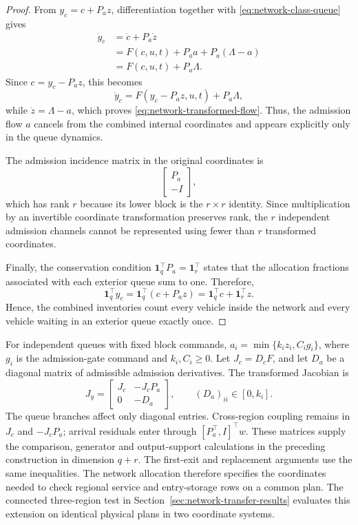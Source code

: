 \documentclass[journal,10pt]{IEEEtran}
\begin{document}
\begin{proof}
From
$y_c=c+P_a z$,
differentiation together with \eqref{eq:network-class-queue} gives
\[
\begin{aligned}
\dot y_c
&=\dot c+P_a\dot z\\
&=F(c,u,t)+P_a a+P_a(\Lambda-a)\\
&=F(c,u,t)+P_a\Lambda.
\end{aligned}
\]
Since $c=y_c-P_a z$, this becomes
\[
\dot y_c=F(y_c-P_a z,u,t)+P_a\Lambda,
\]
while $\dot z=\Lambda-a$, which proves
\eqref{eq:network-transformed-flow}. Thus, the admission flow $a$ cancels
from the combined internal coordinates and appears explicitly only in the
queue dynamics.

The admission incidence matrix in the original coordinates is
\[
\begin{bmatrix}P_a\\-I\end{bmatrix},
\]
which has rank $r$ because its lower block is the $r\times r$ identity.
Since multiplication by an invertible coordinate transformation preserves
rank, the $r$ independent admission channels cannot be represented using
fewer than $r$ transformed coordinates.

Finally, the conservation condition
$\mathbf1_q^\top P_a=\mathbf1_r^\top$ states that the allocation fractions
associated with each exterior queue sum to one. Therefore,
\[
\mathbf1_q^\top y_c
=\mathbf1_q^\top(c+P_a z)
=\mathbf1_q^\top c+\mathbf1_r^\top z.
\]
Hence, the combined inventories count every vehicle inside the network and
every vehicle waiting in an exterior queue exactly once.
\end{proof}

For independent queues with fixed block commands,
$a_i=\min\{k_i z_i,C_i g_i\}$, where $g_i$ is the admission-gate command and
$k_i,C_i\ge0$. Let $J_c=D_cF$, and let $D_a$ be a diagonal matrix of
admissible admission derivatives. The transformed Jacobian is
\begin{equation}
 J_y=\begin{bmatrix}J_c&-J_cP_a\\0&-D_a\end{bmatrix},
 \qquad (D_a)_{ii}\in[0,k_i].
 \label{eq:network-jacobian}
\end{equation}
The queue branches affect only diagonal entries. Cross-region coupling
remains in $J_c$ and $-J_cP_a$; arrival residuals enter through $[P_a^\top,I]^\top w$.
These matrices supply the comparison, generator and output-support calculations
in the preceding construction in dimension $q+r$. The first-exit and
replacement arguments use the same inequalities. The network allocation
therefore specifies the coordinates needed to check regional service and
entry-storage rows on a common plan. The connected three-region test in
Section~\ref{sec:network-transfer-results} evaluates this extension on
identical physical plans in two coordinate systems.
\end{document}
